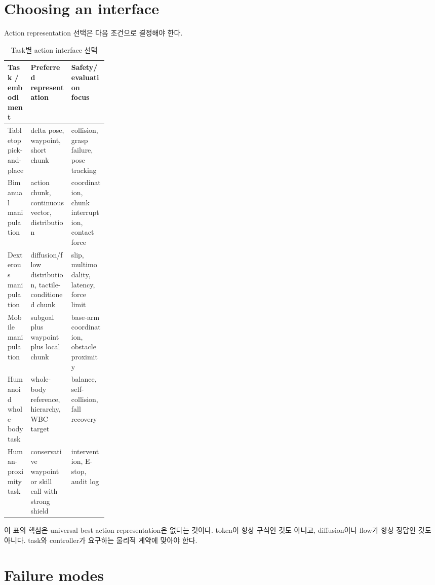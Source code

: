 \section{Choosing an interface}

Action representation 선택은 다음 조건으로 결정해야 한다.
\begin{table}[h]
  \centering
  \caption{Task별 action interface 선택}
  \begin{tabularx}{\linewidth}{p{0.23\linewidth}X X}
    \toprule
    Task / embodiment & Preferred representation & Safety/evaluation focus \\
    \midrule
    Tabletop pick-and-place & delta pose, waypoint, short chunk & collision, grasp failure, pose tracking \\
    Bimanual manipulation & action chunk, continuous vector, distribution & coordination, chunk interruption, contact force \\
    Dexterous manipulation & diffusion/flow distribution, tactile-conditioned chunk & slip, multimodality, latency, force limit \\
    Mobile manipulation & subgoal plus waypoint plus local chunk & base-arm coordination, obstacle proximity \\
    Humanoid whole-body task & whole-body reference, hierarchy, WBC target & balance, self-collision, fall recovery \\
    Human-proximity task & conservative waypoint or skill call with strong shield & intervention, E-stop, audit log \\
    \bottomrule
  \end{tabularx}
  \label{tab:ch13-design-matrix}
\end{table}

이 표의 핵심은 universal best action representation은 없다는 것이다. token이 항상 구식인 것도 아니고, diffusion이나 flow가 항상 정답인 것도 아니다. task와 controller가 요구하는 물리적 계약에 맞아야 한다.

\section{Failure modes}


